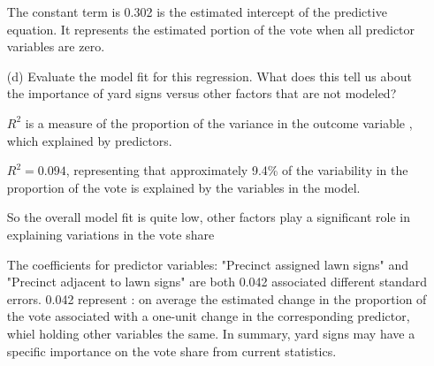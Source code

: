\documentclass[12pt,letterpaper]{article}
\begin{document}
\begin{enumerate}
 The constant term is 0.302 is the estimated intercept of the predictive equation.
 It represents the estimated portion of the vote when all predictor variables are zero.
 \newpage
	\item [(d)] Evaluate the model fit for this regression.  What does this	tell us about the importance of yard signs versus other factors that are not modeled?

$R^2$ is a measure of the proportion of the variance in the outcome variable , which explained by predictors. 

$R^2  =0.094$, representing that approximately 9.4\% of the variability in the proportion of the vote is explained by the variables in the model.

 So the overall model fit is quite low, other factors play a significant role in explaining variations in the vote share

 The coefficients for  predictor variables: "Precinct assigned lawn signs" and "Precinct adjacent to lawn signs" are both 0.042 associated  different standard errors. 0.042 represent : on average the estimated change in the proportion of the vote associated with a one-unit change in the corresponding predictor,  whiel holding other variables  the same. In summary, yard signs may have a specific importance  on the vote share from current statistics.

 
	
\end{enumerate}  
\end{document}
